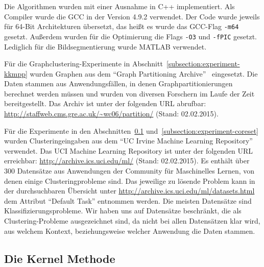 Die Algorithmen wurden mit einer Ausnahme in C++ implementiert. Als Compiler wurde die GCC in der Version 4.9.2 verwendet.
Der Code wurde jeweils für 64-Bit Architekturen übersetzt, das heißt es wurde das GCC-Flag \texttt{-m64} gesetzt. Außerdem
wurden für die Optimierung die Flags \texttt{-O3} und \texttt{-fPIC} gesetzt. Lediglich für die Bildsegmentierung wurde
MATLAB verwendet.

Für die Graphclustering-Experimente in Abschnitt~\ref{subsection:experiment-kkmpp} wurden Graphen aus dem
"`Graph Partitioning Archive"'~\cite{SoperWC04} eingesetzt. Die Daten stammen aus Anwendungsfällen, in denen
Graphpartitionierungen berechnet werden müssen und wurden von diversen Forschern im Laufe der Zeit bereitgestellt. Das
Archiv ist unter der folgenden URL abrufbar: \url{http://staffweb.cms.gre.ac.uk/~wc06/partition/} (Stand: 02.02.2015).

Für die Experimente in den Abschnitten~\ref{subsection:experiment-kernel-method} und~\ref{subsection:experiment-coreset}
wurden Clusteringeingaben aus dem "`UC Irvine Machine Learning Repository"'~\cite{Lichman13} verwendet.
Das UCI Machine Learning Repository
ist unter der folgenden URL erreichbar: \url{http://archive.ics.uci.edu/ml/} (Stand: 02.02.2015). Es enthält über
300 Datensätze aus Anwendungen der Community für Maschinelles Lernen, von denen einige Clusteringprobleme sind. Das jeweilige
zu lösende Problem kann in der durchsuchbaren Übersicht unter \url{http://archive.ics.uci.edu/ml/datasets.html} dem
Attribut "`Default Task"' entnommen werden. Die meisten Datensätze sind Klassifizierungsprobleme. Wir haben uns auf Datensätze
beschränkt, die als Clustering-Probleme ausgezeichnet sind, da nicht bei allen Datensätzen klar wird, aus welchem Kontext,
beziehungsweise welcher Anwendung die Daten stammen.

\subsection{Die Kernel Methode}
\label{subsection:experiment-kernel-method}

